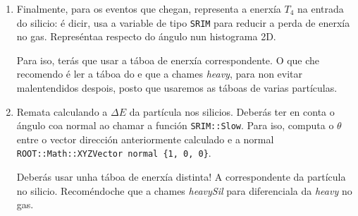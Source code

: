 \documentclass[11pt, a4paper]{article}
\newcommand{\iso}[2]{\ce{^{#1}#2}}
\begin{document}
\begin{enumerate}
\begin{itemize}
\begin{lstlisting}
    \end{lstlisting}
              \item O índice do muro de silicions, xa que pode haber varios. Como só hai un, pasa un 0.
              \item Os seguintes argumentos van \textbf{devolver} o resultado da operación, e deberás pasar as variables obrigatoriamente:
                    \begin{itemize}
                        \item Un \lstinline|bool| co lado. Ignoraremos isto de momento.
                        \item A distancia dende o vertice ao punto de impacto, en \textbf{\unit{\cm}}. Debes convertela a \unit{\mm}. É a variable máis importante.
                        \item O tipo de silicio. Só hai un, así que ignorarémolo.
                        \item O índice do silicio. Moi importante tamén: se a partícula non chega ao silicon, vale -1.
                        \item Un \lstinline|XYZPoint| co punto de impacto. Ignorarémolo.
                    \end{itemize}
          \end{itemize}

          Deste xeito, só os eventos que cheguen xeometricamente ao silicio terán un valor de \lstinline|silIndex != -1|, e o máis importante, terás a distancia que teñen que viaxar para chegar alí.

          A primeira vez que necesites usar a xeometría debes creala. Hai un macro na carpeta \textit{Geo/Build.cxx} que tes que executar só unha vez. Isto vai crear un ficheiro \textit{.root} cos parámetros necesarios que despois lerás como: \lstinline|geo.ReadGeometry("./Geo/", "simple");|

          \item Finalmente, para os eventos que chegan, representa a enerxía $T_4$ na entrada do silicio: é dicir, usa a variable de tipo \lstinline|SRIM| para reducir a perda de enerxía no gas. Represéntaa respecto do ángulo nun histograma 2D.

          Para iso, terás que usar a táboa de enerxía correspondente. O que che recomendo é ler a táboa do \iso{12}{Li} e que a chames \textit{heavy}, para non evitar malentendidos despois, posto que usaremos as táboas de varias partículas.
          \item Remata calculando a $\Delta E$ da partícula nos silicios. Deberás ter en conta o ángulo coa normal ao chamar a función \lstinline|SRIM::Slow|. Para iso, computa o $\theta$ entre o vector dirección anteriormente calculado e a normal \lstinline|ROOT::Math::XYZVector normal {1, 0, 0}|.

          Deberás usar unha táboa de enerxía distinta! A correspondente da partícula no silicio. Recoméndoche que a chames \textit{heavySil} para diferenciala da \textit{heavy} no gas.
\end{enumerate} 
\end{document}
